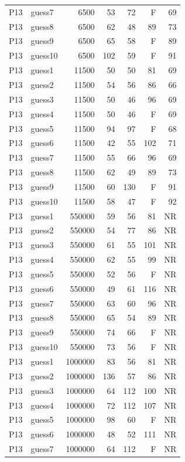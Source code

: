 {\begin{longtable}{llrrrrr}
P13 & guess7 & 6500 & 53 & 72 & F & 69 \\
P13 & guess8 & 6500 & 62 & 48 & 89 & 73 \\
P13 & guess9 & 6500 & 65 & 58 & F & 89 \\
P13 & guess10 & 6500 & 102 & 59 & F & 91 \\
P13 & guess1 & 11500 & 50 & 50 & 81 & 69 \\
P13 & guess2 & 11500 & 54 & 56 & 86 & 66 \\
P13 & guess3 & 11500 & 50 & 46 & 96 & 69 \\
P13 & guess4 & 11500 & 50 & 46 & F & 69 \\
P13 & guess5 & 11500 & 94 & 97 & F & 68 \\
P13 & guess6 & 11500 & 42 & 55 & 102 & 71 \\
P13 & guess7 & 11500 & 55 & 66 & 96 & 69 \\
P13 & guess8 & 11500 & 62 & 49 & 89 & 73 \\
P13 & guess9 & 11500 & 60 & 130 & F & 91 \\
P13 & guess10 & 11500 & 58 & 47 & F & 92 \\
P13 & guess1 & 550000 & 59 & 56 & 81 & NR \\
P13 & guess2 & 550000 & 54 & 77 & 86 & NR \\
P13 & guess3 & 550000 & 61 & 55 & 101 & NR \\
P13 & guess4 & 550000 & 62 & 55 & 99 & NR \\
P13 & guess5 & 550000 & 52 & 56 & F & NR \\
P13 & guess6 & 550000 & 49 & 61 & 116 & NR \\
P13 & guess7 & 550000 & 63 & 60 & 96 & NR \\
P13 & guess8 & 550000 & 65 & 54 & 89 & NR \\
P13 & guess9 & 550000 & 74 & 66 & F & NR \\
P13 & guess10 & 550000 & 73 & 56 & F & NR \\
P13 & guess1 & 1000000 & 83 & 56 & 81 & NR \\
P13 & guess2 & 1000000 & 136 & 57 & 86 & NR \\
P13 & guess3 & 1000000 & 64 & 112 & 100 & NR \\
P13 & guess4 & 1000000 & 72 & 112 & 107 & NR \\
P13 & guess5 & 1000000 & 98 & 60 & F & NR \\
P13 & guess6 & 1000000 & 48 & 52 & 111 & NR \\
P13 & guess7 & 1000000 & 64 & 112 & F & NR \\

\end{longtable}}
